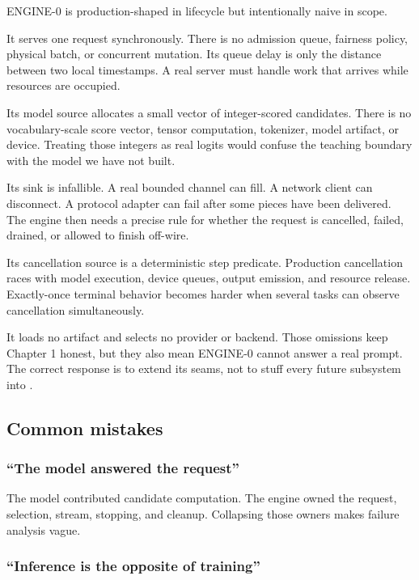 \documentclass[
  10pt,
]{article}
\begin{document}
ENGINE-0 is production-shaped in lifecycle but intentionally naive in
scope.

It serves one request synchronously. There is no admission queue,
fairness policy, physical batch, or concurrent mutation. Its queue delay
is only the distance between two local timestamps. A real server must
handle work that arrives while resources are occupied.

Its model source allocates a small vector of integer-scored candidates.
There is no vocabulary-scale score vector, tensor computation,
tokenizer, model artifact, or device. Treating those integers as real
logits would confuse the teaching boundary with the model we have not
built.

Its sink is infallible. A real bounded channel can fill. A network
client can disconnect. A protocol adapter can fail after some pieces
have been delivered. The engine then needs a precise rule for whether
the request is cancelled, failed, drained, or allowed to finish
off-wire.

Its cancellation source is a deterministic step predicate. Production
cancellation races with model execution, device queues, output emission,
and resource release. Exactly-once terminal behavior becomes harder when
several tasks can observe cancellation simultaneously.

It loads no artifact and selects no provider or backend. Those omissions
keep Chapter 1 honest, but they also mean ENGINE-0 cannot answer a real
prompt. The correct response is to extend its seams, not to stuff every
future subsystem into \texttt{}.

\subsection{Common mistakes}\label{common-mistakes}

\subsubsection{``The model answered the
request''}\label{the-model-answered-the-request}

The model contributed candidate computation. The engine owned the
request, selection, stream, stopping, and cleanup. Collapsing those
owners makes failure analysis vague.

\subsubsection{``Inference is the opposite of
training''}\label{inference-is-the-opposite-of-training}
\end{document}
